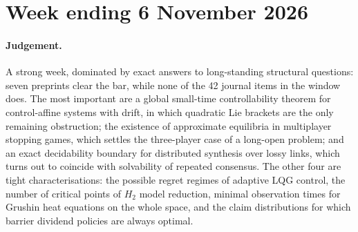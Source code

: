 \documentclass[11pt,a4paper]{article}
\begin{document}
\section{Week ending 6 November 2026}
\label{week:2026-11-06}
\paragraph{Judgement.} A strong week, dominated by exact answers to long-standing structural questions: seven preprints clear the bar, while none of the 42 journal items in the window does. The most important are a global small-time controllability theorem for control-affine systems with drift, in which quadratic Lie brackets are the only remaining obstruction; the existence of approximate equilibria in multiplayer stopping games, which settles the three-player case of a long-open problem; and an exact decidability boundary for distributed synthesis over lossy links, which turns out to coincide with solvability of repeated consensus. The other four are tight characterisations: the possible regret regimes of adaptive \ac{LQG} control, the number of critical points of $H_2$ model reduction, minimal observation times for Grushin heat equations on the whole space, and the claim distributions for which barrier dividend policies are always optimal.
\end{document}
